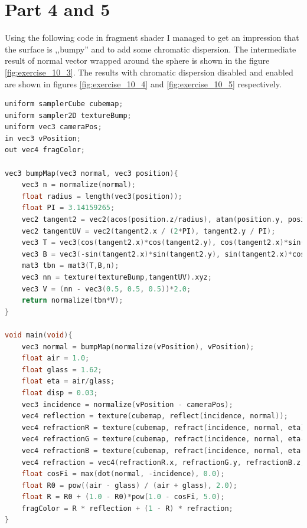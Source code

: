 \section{Part 4 and 5}
Using the following code in fragment shader I managed to get an impression that
the surface is ,,bumpy'' and to add some chromatic dispersion. The intermediate
result of normal vector wrapped around the sphere is shown in the figure \ref{fig:exercise_10_3}.
The results with chromatic dispersion disabled and enabled are shown in figures
\ref{fig:exercise_10_4} and \ref{fig:exercise_10_5} respectively.
\clearpage
\begin{lstlisting}[language=cpp, caption={bump-map fragment shader}]
uniform samplerCube cubemap;
uniform sampler2D textureBump;
uniform vec3 cameraPos;
in vec3 vPosition;
out vec4 fragColor;

vec3 bumpMap(vec3 normal, vec3 position){
	vec3 n = normalize(normal);
	float radius = length(vec3(position));
	float PI = 3.14159265;
	vec2 tangent2 = vec2(acos(position.z/radius), atan(position.y, position.x));
	vec2 tangentUV = vec2(tangent2.x / (2*PI), tangent2.y / PI);
	vec3 T = vec3(cos(tangent2.x)*cos(tangent2.y), cos(tangent2.x)*sin(tangent2.y),-sin(tangent2.x));
	vec3 B = vec3(-sin(tangent2.x)*sin(tangent2.y), sin(tangent2.x)*cos(tangent2.y), 0.0);
	mat3 tbn = mat3(T,B,n);
	vec3 nn = texture(textureBump,tangentUV).xyz;
	vec3 V = (nn - vec3(0.5, 0.5, 0.5))*2.0;
	return normalize(tbn*V);
}

void main(void){
	vec3 normal = bumpMap(normalize(vPosition), vPosition);
	float air = 1.0;
	float glass = 1.62;
	float eta = air/glass;
	float disp = 0.03;
	vec3 incidence = normalize(vPosition - cameraPos);
	vec4 reflection = texture(cubemap, reflect(incidence, normal));
	vec4 refractionR = texture(cubemap, refract(incidence, normal, eta));
	vec4 refractionG = texture(cubemap, refract(incidence, normal, eta-disp));
	vec4 refractionB = texture(cubemap, refract(incidence, normal, eta-(2*disp)));
	vec4 refraction = vec4(refractionR.x, refractionG.y, refractionB.z, 1.0);
	float cosFi = max(dot(normal, -incidence), 0.0);
	float R0 = pow((air - glass) / (air + glass), 2.0);
	float R = R0 + (1.0 - R0)*pow(1.0 - cosFi, 5.0);
	fragColor = R * reflection + (1 - R) * refraction;
}
\end{lstlisting}
\clearpage
